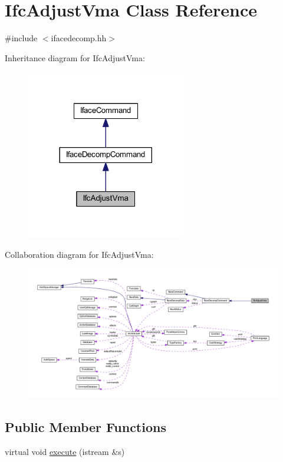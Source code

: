 \hypertarget{class_ifc_adjust_vma}{}\section{Ifc\+Adjust\+Vma Class Reference}
\label{class_ifc_adjust_vma}


{\ttfamily \#include $<$ifacedecomp.\+hh$>$}



Inheritance diagram for Ifc\+Adjust\+Vma\+:
\nopagebreak
\begin{figure}[H]
\begin{center}
\leavevmode
\includegraphics[width=197pt]{class_ifc_adjust_vma__inherit__graph}
\end{center}
\end{figure}


Collaboration diagram for Ifc\+Adjust\+Vma\+:
\nopagebreak
\begin{figure}[H]
\begin{center}
\leavevmode
\includegraphics[width=350pt]{class_ifc_adjust_vma__coll__graph}
\end{center}
\end{figure}
\subsection*{Public Member Functions}
\begin{DoxyCompactItemize}
\item 
virtual void \mbox{\hyperlink{class_ifc_adjust_vma_aa7bfa89237119c9aaa0db9c38ec5112b}{execute}} (istream \&s)
\end{DoxyCompactItemize}
